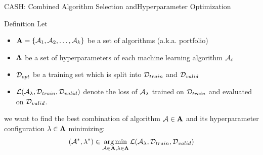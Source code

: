 \begin{frame}[c]{CASH: Combined Algorithm Selection and\newline Hyperparameter Optimization}

\begin{block}{Definition}
	Let
	\begin{itemize}
		\item \alert{$\mathbf{A} = \{\mathcal{A}_1, \mathcal{A}_2, \ldots, \mathcal{A}_k\}$ be a set of algorithms (a.k.a. portfolio)}
		\item $\mathbf{\Lambda}$ be a set of hyperparameters of each machine learning algorithm $\mathcal{A}_i$
		\item $\mathcal{D}_{opt}$ be a training set which is split into $\mathcal{D}_{train}$ and $\mathcal{D}_{valid}$ 
		\item $\mathcal{L}(\mathcal{A}_{\mathbf{\lambda}}, \mathcal{D}_{train}, \mathcal{D}_{valid})$ denote the loss of $\mathcal{A}_{\mathbf{\lambda}}$ trained on $\mathcal{D}_{train}$ and evaluated on $\mathcal{D}_{valid}$.
	\end{itemize}
	we want to find the best combination of algorithm $\mathcal{A} \in \mathbf{A}$ and its hyperparameter configuration $\mathbf{\lambda} \in \mathbf{\Lambda}$ minimizing:
	\begin{equation}
	(\mathcal{A}^*, \mathbf{\lambda}^*) \in \operatorname*{arg\,min}_{\mathcal{A} \in \mathbf{A}, \mathbf{\lambda} \in \mathbf{\Lambda}} \mathcal{L}(\mathcal{A}_{\mathbf{\lambda}}, \mathcal{D}_{train}, \mathcal{D}_{valid}) \nonumber
	\end{equation}
\end{block}

\end{frame}
